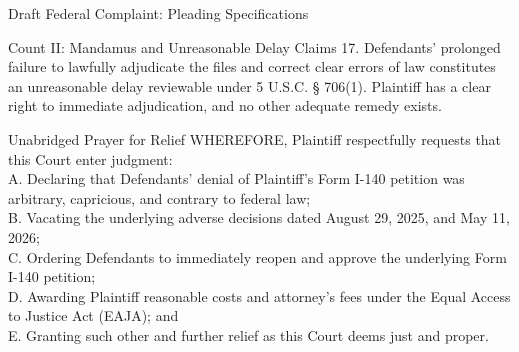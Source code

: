 \documentclass[11pt]{beamer}
\begin{document}
\begin{frame}[allowframebreaks]{Draft Federal Complaint: Pleading Specifications}
\begin{block}{Count II: Mandamus and Unreasonable Delay Claims}
			17. Defendants' prolonged failure to lawfully adjudicate the files and correct clear errors of law constitutes an unreasonable delay reviewable under 5 U.S.C. § 706(1). Plaintiff has a clear right to immediate adjudication, and no other adequate remedy exists.
		\end{block}
		\framebreak
		\begin{block}{Unabridged Prayer for Relief}
			WHEREFORE, Plaintiff respectfully requests that this Court enter judgment: \\
			A. Declaring that Defendants' denial of Plaintiff's Form I-140 petition was arbitrary, capricious, and contrary to federal law; \\
			B. Vacating the underlying adverse decisions dated August 29, 2025, and May 11, 2026; \\
			C. Ordering Defendants to immediately reopen and approve the underlying Form I-140 petition; \\
			D. Awarding Plaintiff reasonable costs and attorney's fees under the Equal Access to Justice Act (EAJA); and \\
			E. Granting such other and further relief as this Court deems just and proper.
		\end{block}
	\end{frame}
	
\end{document}

